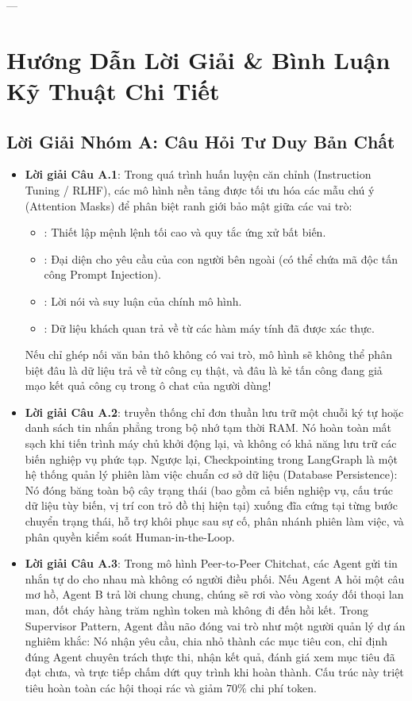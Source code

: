 ---

\section{Hướng Dẫn Lời Giải \& Bình Luận Kỹ Thuật Chi Tiết}
\label{sec:ch09-solutions}

\subsection{Lời Giải Nhóm A: Câu Hỏi Tư Duy Bản Chất}
\begin{itemize}
  \item \textbf{Lời giải Câu A.1}:
  Trong quá trình huấn luyện căn chỉnh (Instruction Tuning / RLHF), các mô hình nền tảng được tối ưu hóa các mẫu chú ý (Attention Masks) để phân biệt ranh giới bảo mật giữa các vai trò:
  \begin{itemize}
    \item {}: Thiết lập mệnh lệnh tối cao và quy tắc ứng xử bất biến.
    \item {}: Đại diện cho yêu cầu của con người bên ngoài (có thể chứa mã độc tấn công Prompt Injection).
    \item {}: Lời nói và suy luận của chính mô hình.
    \item {}: Dữ liệu khách quan trả về từ các hàm máy tính đã được xác thực.
  \end{itemize}
  Nếu chỉ ghép nối văn bản thô không có vai trò, mô hình sẽ không thể phân biệt đâu là dữ liệu trả về từ công cụ thật, và đâu là kẻ tấn công đang giả mạo kết quả công cụ trong ô chat của người dùng!

  \item \textbf{Lời giải Câu A.2}:
   truyền thống chỉ đơn thuần lưu trữ một chuỗi ký tự hoặc danh sách tin nhắn phẳng trong bộ nhớ tạm thời RAM. Nó hoàn toàn mất sạch khi tiến trình máy chủ khởi động lại, và không có khả năng lưu trữ các biến nghiệp vụ phức tạp.
  Ngược lại, Checkpointing trong LangGraph là một hệ thống quản lý phiên làm việc chuẩn cơ sở dữ liệu (Database Persistence): Nó đóng băng toàn bộ cây trạng thái (bao gồm cả biến nghiệp vụ, cấu trúc dữ liệu tùy biến, vị trí con trỏ đồ thị hiện tại) xuống đĩa cứng tại từng bước chuyển trạng thái, hỗ trợ khôi phục sau sự cố, phân nhánh phiên làm việc, và phân quyền kiểm soát Human-in-the-Loop.

  \item \textbf{Lời giải Câu A.3}:
  Trong mô hình Peer-to-Peer Chitchat, các Agent gửi tin nhắn tự do cho nhau mà không có người điều phối. Nếu Agent A hỏi một câu mơ hồ, Agent B trả lời chung chung, chúng sẽ rơi vào vòng xoáy đối thoại lan man, đốt cháy hàng trăm nghìn token mà không đi đến hồi kết.
  Trong Supervisor Pattern, Agent đầu não đóng vai trò như một người quản lý dự án nghiêm khắc: Nó nhận yêu cầu, chia nhỏ thành các mục tiêu con, chỉ định đúng Agent chuyên trách thực thi, nhận kết quả, đánh giá xem mục tiêu đã đạt chưa, và trực tiếp chấm dứt quy trình khi hoàn thành. Cấu trúc này triệt tiêu hoàn toàn các hội thoại rác và giảm $70\%$ chi phí token.


\end{itemize}
